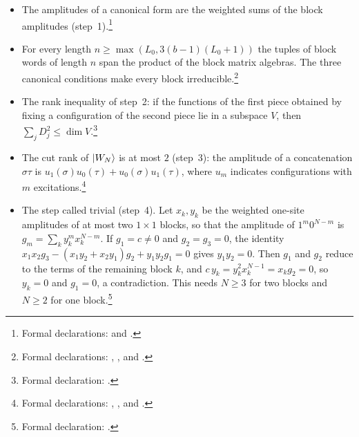 \documentclass{article}
\begin{document}
\begin{itemize}
    \item The amplitudes of a canonical form are the weighted sums of the block
          amplitudes (step~1).\footnote{Formal declarations:
               and
              .}

    \item For every length $n\geq\max(L_0,3(b-1)(L_0+1))$ the tuples of block
          words of length $n$ span the product of the block matrix algebras. The
          three canonical conditions make every block irreducible.\footnote{Formal
              declarations:
              ,
              , and
              .}

    \item The rank inequality of step~2: if the functions of the first piece
          obtained by fixing a configuration of the second piece lie in a subspace
          $V$, then $\sum_jD_j^2\leq\dim V$.\footnote{Formal declaration:
              .}

    \item The cut rank of $|W_N\rangle$ is at most $2$ (step~3): the amplitude
          of a concatenation $\sigma\tau$ is
          $u_1(\sigma)u_0(\tau)+u_0(\sigma)u_1(\tau)$, where $u_m$ indicates
          configurations with $m$ excitations.\footnote{Formal declarations:
              ,
              , and
              .}

    \item The step called trivial (step~4). Let $x_k,y_k$ be the weighted
          one-site amplitudes of at most two $1\times1$ blocks, so that the
          amplitude of $1^m0^{N-m}$ is $g_m=\sum_ky_k^mx_k^{N-m}$. If
          $g_1=c\neq0$ and $g_2=g_3=0$, the identity
          $x_1x_2g_3-(x_1y_2+x_2y_1)g_2+y_1y_2g_1=0$ gives $y_1y_2=0$. Then
          $g_1$ and $g_2$ reduce to the terms of the remaining block $k$, and $c\,y_k=y_k^2x_k^{N-1}=x_kg_2=0$, so $y_k=0$ and
          $g_1=0$, a contradiction.
          This needs $N\geq3$ for two blocks and $N\geq2$ for one
          block.\footnote{Formal declaration:
              .}


\end{itemize}
\end{document}
